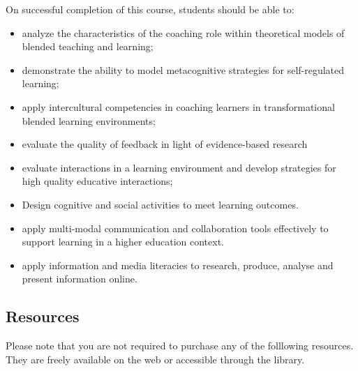 \documentclass[
]{book}
\providecommand{\tightlist}{%
  \setlength{\itemsep}{0pt}\setlength{\parskip}{0pt}}
\begin{document}
On successful completion of this course, students should be able to:

\begin{itemize}
\tightlist
\item
  analyze the characteristics of the coaching role within theoretical models of blended teaching and learning;
\item
  demonstrate the ability to model metacognitive strategies for self-regulated learning;
\item
  apply intercultural competencies in coaching learners in transformational blended learning environments;
\item
  evaluate the quality of feedback in light of evidence-based research
\item
  evaluate interactions in a learning environment and develop strategies for high quality educative interactions;
\item
  Design cognitive and social activities to meet learning outcomes.
\item
  apply multi-modal communication and collaboration tools effectively to support learning in a higher education context.
\item
  apply information and media literacies to research, produce, analyse and present information online.
\end{itemize}

\hypertarget{resources}{%
\subsection{Resources}\label{resources}}

Please note that you are not required to purchase any of the folllowing resources. They are freely available on the web or accessible through the library.
\end{document}
